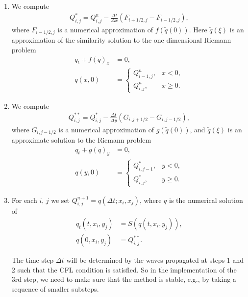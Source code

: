 \documentclass[12pt]{article}
\begin{document}
\begin{enumerate}
    \setlength{\itemindent}{+.5in}
    \item We compute 
        \begin{align}
        Q^{*}_{i,j}=Q^n_{i,j}-\frac{\Delta t}{\Delta x}(F_{i+1/2,j}-F_{i-1/2,j}),
        \end{align}
        where $F_{i-1/2,j}$ is a numerical approximation of $f(\tilde{q}(0))$. Here $\tilde{q}(\xi)$ is an approximation of the similarity solution to the one dimensional Riemann problem 
        \begin{align}
            \label{eq:RP x direction}
            q_t+f(q)_x&=0,\\
            q(x,0)&=\begin{cases}
                Q^n_{i-1,j}, &x<0,\\
                Q^n_{i,j}, &x\geq 0.
            \end{cases}
        \end{align}

    \item We compute
        \begin{align}
            Q^{**}_{i,j}=Q^{*}_{i,j}-\frac{\Delta t}{\Delta y}(G_{i,j+1/2}-G_{i,j-1/2}),
        \end{align}
        where $G_{i,j-1/2}$ is a numerical approximation of $g(\tilde{q}(0))$, and  $\tilde{q}(\xi)$ is an approximate solution to the Riemann problem 
        \begin{align}
            \label{eq:RP y direction}
            q_t+g(q)_y&=0,\\
            q(y,0)&=\begin{cases}
                Q^*_{i,j-1}, &y<0,\\
                Q^*_{i,j}, &y\geq 0.
            \end{cases}
        \end{align}
    \item For each $i,\, j$ we set $Q^{n+1}_{i,j}=q(\Delta t;x_i,x_j)$, where $q$ is the numerical solution of 
        \begin{align}
            q_t(t,x_i,y_j)&=S(q(t,x_i,y_j)),\\
            q(0,x_i,y_j)&=Q^{**}_{i,j}.
        \end{align}

The time step $\Delta t$ will  be determined by the waves propagated at steps 1 and 2 such that the CFL condition is satisfied. 
So in the implementation of the 3rd step, we need to make sure that the method is stable, e.g., by taking a sequence of smaller substeps.

\end{enumerate}
\end{document}
